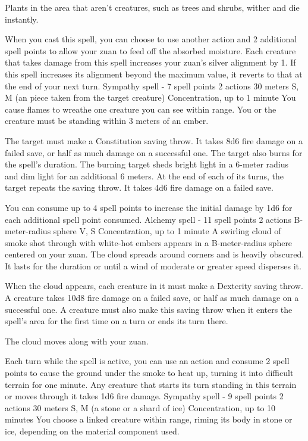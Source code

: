     Plants in the area that aren't creatures, such as trees and shrubs, wither and die instantly.

    When you cast this spell, you can choose to use another action and 2 additional spell points to allow your zuan to feed off the absorbed moisture.
    Each creature that takes damage from this spell increases your zuan's silver alignment by 1.
    If this spell increases its alignment beyond the maximum value, it reverts to that at the end of your next turn.
    {Sympathy spell - 7 spell points}
    {2 actions}
    {30 meters}
    {S, M (an piece taken from the target creature)}
    {Concentration, up to 1 minute}
    You cause flames to wreathe one creature you can see within range.
    You or the creature must be standing within 3 meters of an ember.

    The target must make a Constitution saving throw.
    It takes 8d6 fire damage on a failed save, or half as much damage on a successful one.
    The target also burns for the spell's duration.
    The burning target sheds bright light in a 6-meter radius and dim light for an additional 6 meters.
    At the end of each of its turns, the target repeats the saving throw.
    It takes 4d6 fire damage on a failed save.

    You can consume up to 4 spell points to increase the initial damage by 1d6 for each additional spell point consumed.
    {Alchemy spell - 11 spell points}
    {2 actions}
    {B-meter-radius sphere}
    {V, S}
    {Concentration, up to 1 minute}
    A swirling cloud of smoke shot through with white-hot embers appears in a B-meter-radius sphere centered on your zuan.
    The cloud spreads around corners and is heavily obscured.
    It lasts for the duration or until a wind of moderate or greater speed disperses it.

    When the cloud appears, each creature in it must make a Dexterity saving throw.
    A creature takes 10d8 fire damage on a failed save, or half as much damage on a successful one.
    A creature must also make this saving throw when it enters the spell's area for the first time on a turn or ends its turn there.

    The cloud moves along with your zuan.

    Each turn while the spell is active, you can use an action and consume 2 spell points to cause the ground under the smoke to heat up, turning it into difficult terrain for one minute.
    Any creature that starts its turn standing in this terrain or moves through it takes 1d6 fire damage.
    {Sympathy spell - 9 spell points}
    {2 actions}
    {30 meters}
    {S, M (a stone or a shard of ice)}
    {Concentration, up to 10 minutes}
    You choose a linked creature within range, riming its body in stone or ice, depending on the material component used.

